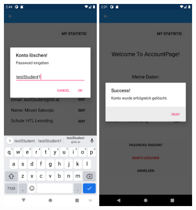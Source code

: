 \begin{figure}[h]
    \begin{center}
        \includegraphics[width=5cm]{pics/Xamarin Student/25 Acc delete pass.png}\hfill
        \includegraphics[width=5cm]{pics/Xamarin Student/23 Delete Acc.png}
        \end{center}
\end{figure}
